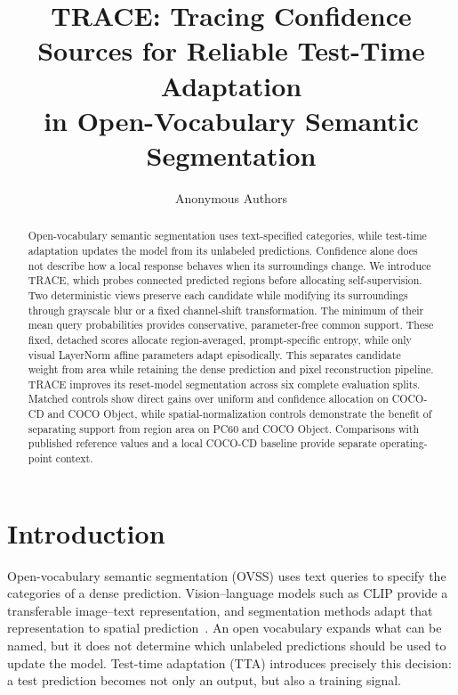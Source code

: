 \documentclass[letterpaper]{article}
\title{TRACE: Tracing Confidence Sources for Reliable Test-Time Adaptation\\in Open-Vocabulary Semantic Segmentation}
\author{Anonymous Authors}
\begin{document}
\raggedbottom
\maketitle

\begin{abstract}
Open-vocabulary semantic segmentation uses text-specified categories, while test-time adaptation updates the model from its unlabeled predictions. Confidence alone does not describe how a local response behaves when its surroundings change. We introduce TRACE, which probes connected predicted regions before allocating self-supervision. Two deterministic views preserve each candidate while modifying its surroundings through grayscale blur or a fixed channel-shift transformation. The minimum of their mean query probabilities provides conservative, parameter-free common support. These fixed, detached scores allocate region-averaged, prompt-specific entropy, while only visual LayerNorm affine parameters adapt episodically. This separates candidate weight from area while retaining the dense prediction and pixel reconstruction pipeline. TRACE improves its reset-model segmentation across six complete evaluation splits. Matched controls show direct gains over uniform and confidence allocation on COCO-CD and COCO Object, while spatial-normalization controls demonstrate the benefit of separating support from region area on PC60 and COCO Object. Comparisons with published reference values and a local COCO-CD baseline provide separate operating-point context.
\end{abstract}

\section{Introduction}
Open-vocabulary semantic segmentation (OVSS) uses text queries to specify the categories of a dense prediction. Vision--language models such as CLIP provide a transferable image--text representation, and segmentation methods adapt that representation to spatial prediction~\cite{radford2021clip,hajimiri2025naclip}. An open vocabulary expands what can be named, but it does not determine which unlabeled predictions should be used to update the model. Test-time adaptation (TTA) introduces precisely this decision: a test prediction becomes not only an output, but also a training signal.
\end{document}
